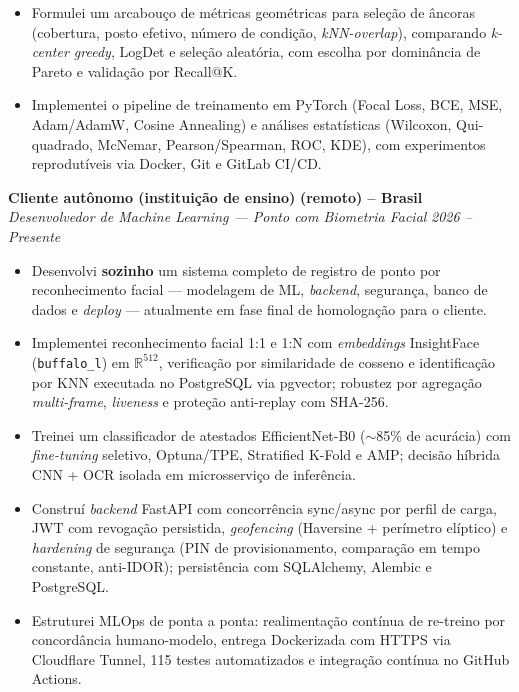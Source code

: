 \documentclass[a4paper,10pt]{article}
\newcommand{\entrada}[4]{%
    \noindent\textbf{#1} \hfill \textbf{#2}\\
    \textit{#3} \hfill \textit{#4}\par
}
\begin{document}
\begin{itemize}
    \item Formulei um arcabouço de métricas geométricas para seleção de
    âncoras (cobertura, posto efetivo, número de condição,
    \textit{kNN-overlap}), comparando \textit{k-center greedy}, LogDet e
    seleção aleatória, com escolha por dominância de Pareto e validação por
    Recall@K.

    \item Implementei o pipeline de treinamento em PyTorch (Focal Loss, BCE,
    MSE, Adam/AdamW, Cosine Annealing) e análises estatísticas (Wilcoxon,
    Qui-quadrado, McNemar, Pearson/Spearman, ROC, KDE), com experimentos
    reprodutíveis via Docker, Git e GitLab CI/CD.

\end{itemize}

\vspace{4pt}

\entrada
    {Cliente autônomo (instituição de ensino)}
    {(remoto) -- Brasil}
    {Desenvolvedor de Machine Learning --- Ponto com Biometria Facial}
    {2026 -- Presente}

\begin{itemize}

    \item Desenvolvi \textbf{sozinho} um sistema completo de registro de
    ponto por reconhecimento facial --- modelagem de ML, \textit{backend},
    segurança, banco de dados e \textit{deploy} --- atualmente em fase final
    de homologação para o cliente.

    \item Implementei reconhecimento facial 1:1 e 1:N com
    \textit{embeddings} InsightFace (\texttt{buffalo\_l}) em
    $\mathbb{R}^{512}$, verificação por similaridade de cosseno e
    identificação por KNN executada no PostgreSQL via pgvector; robustez por
    agregação \textit{multi-frame}, \textit{liveness} e proteção anti-replay
    com SHA-256.

    \item Treinei um classificador de atestados EfficientNet-B0
    ($\sim$85\% de acurácia) com \textit{fine-tuning} seletivo, Optuna/TPE,
    Stratified K-Fold e AMP; decisão híbrida CNN + OCR isolada em
    microsserviço de inferência.

    \item Construí \textit{backend} FastAPI com concorrência sync/async por
    perfil de carga, JWT com revogação persistida, \textit{geofencing}
    (Haversine + perímetro elíptico) e \textit{hardening} de segurança
    (PIN de provisionamento, comparação em tempo constante, anti-IDOR);
    persistência com SQLAlchemy, Alembic e PostgreSQL.

    \item Estruturei MLOps de ponta a ponta: realimentação contínua de
    re-treino por concordância humano-modelo, entrega Dockerizada com HTTPS
    via Cloudflare Tunnel, 115 testes automatizados e integração contínua no
    GitHub Actions.

\end{itemize}
\end{document}
